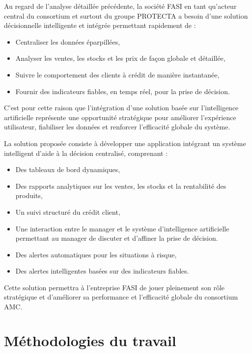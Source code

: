 \documentclass[a4paper,12pt]{report}
\begin{document}
Au regard de l'analyse détaillée précédente, la société FASI en tant qu'acteur central du consortium et surtout du groupe PROTECTA a besoin d'une solution décisionnelle intelligente et intégrée permettant rapidement de :

\begin{itemize}
    \item Centraliser les données éparpillées,
    \item Analyser les ventes, les stocks et les prix de façon globale et détaillée,
    \item Suivre le comportement des clients à crédit de manière instantanée,
    \item Fournir des indicateurs fiables, en temps réel, pour la prise de décision.
\end{itemize}

C'est pour cette raison que l'intégration d'une solution basée sur l'intelligence artificielle représente une opportunité stratégique pour améliorer l'expérience utilisateur, fiabiliser les données et renforcer l'efficacité globale du système.

La solution proposée consiste à développer une application intégrant un système intelligent d'aide à la décision centralisé, comprenant :

\begin{itemize}
    \item Des tableaux de bord dynamiques,
    \item Des rapports analytiques sur les ventes, les stocks et la rentabilité des produits,
    \item Un suivi structuré du crédit client,
    \item Une interaction entre le manager et le système d’intelligence artificielle permettant au manager de discuter et d’affiner la prise de décision.
    \item Des alertes automatiques pour les situations à risque,
    \item Des alertes intelligentes basées sur des indicateurs fiables.
\end{itemize}

Cette solution permettra à l'entreprise FASI de jouer pleinement son rôle stratégique et d'améliorer sa performance et l'efficacité globale du consortium AMC.

\section{Méthodologies du travail}
\end{document}
